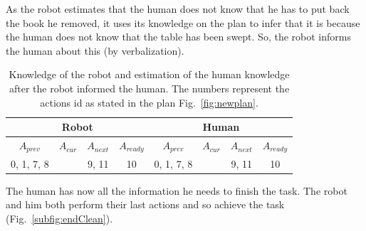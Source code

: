 \documentclass[english,a4paper,11pt,twoside]{StyleThese}
\begin{document}
As the robot estimates that the human does not know that he has to put back the book he removed, it uses its knowledge on the plan to infer that it is because the human does not know that the table has been swept. So, the robot informs the human about this (by verbalization). 

\begin{table}[!h]
\begin{center}
\begin{tabular}{|c|c|c|c||c|c|c|c|}
\hline
\multicolumn{4}{|c||}{Robot} & \multicolumn{4}{c|}{Human}\\
\hline
$A_{prev}$ & $A_{cur}$ & $A_{next}$ & $A_{ready}$ & $A_{prev}$ & $A_{cur}$ & $A_{next}$ & $A_{ready}$\\
\hline
\hline
0, 1, 7, 8  &  & 9, 11 & 10 & 0, 1, 7, 8 &  & 9, 11 & 10\\
\hline
\end{tabular}
\end{center}
\caption{Knowledge of the robot and estimation of the human knowledge after the robot informed the human. The numbers represent the actions id as stated in the plan Fig.~\ref{fig:newplan}.}
\label{table:results}
\end{table}

The human has now all the information he needs to finish the task. The robot and him both perform their last actions and so achieve the task (Fig.~\ref{subfig:endClean}).
\end{document}
